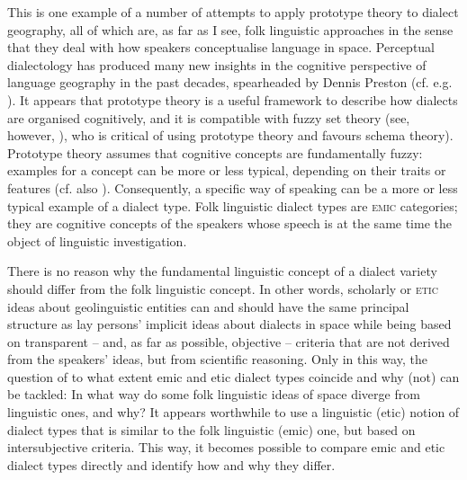\documentclass[output=paper]{LSP/langsci}
\begin{document}
This is one example of a number of attempts to apply prototype theory to dialect geography, all of which are, as far as I see, folk linguistic approaches \citep{christen_dialekt_1998,anders_was_2010,klausmann_wie_2006,kristiansen_style-shifting_2008,beeching_prototype-theoretic_2009} in the sense that they deal with how speakers conceptualise language in space. Perceptual dialectology has produced many new insights in the cognitive perspective of language geography in the past decades, spearheaded by Dennis Preston (cf. e.g. \citealt{preston_perceptual_1989,preston_handbook_1999,anders_perceptual_2010}). It appears that prototype theory \citep{rosch_natural_1973,lakoff_women_1987} is a useful framework to describe how dialects are organised cognitively, and it is compatible with fuzzy set theory (see, however, \citealt[218--250]{kretzschmar_linguistics_2009}), who is critical of using prototype theory and favours schema theory). Prototype theory assumes that cognitive concepts are fundamentally fuzzy: examples for a concept can be more or less typical, depending on their traits or features (cf. also \citealt{bailey_boundaries_1973}). Consequently, a specific way of speaking can be a more or less typical example of a dialect type. Folk linguistic dialect types are \textsc{emic} categories; they are cognitive concepts of the speakers whose speech is at the same time the object of linguistic investigation.

There is no reason why the fundamental linguistic concept of a dialect variety should differ from the folk linguistic concept. In other words, scholarly or \textsc{etic} ideas about geolinguistic entities can and should have the same principal structure as lay persons’ implicit ideas about dialects in space while being based on transparent – and, as far as possible, objective – criteria that are not derived from the speakers’ ideas, but from scientific reasoning. Only in this way, the question of to what extent emic and etic dialect types coincide and why (not) can be tackled: In what way do some folk linguistic ideas of space diverge from linguistic ones, and why? It appears worthwhile to use a linguistic (etic) notion of dialect types that is similar to the folk linguistic (emic) one, but based on intersubjective criteria. This way, it becomes possible to compare emic and etic dialect types directly and identify how and why they differ. 
\end{document}
